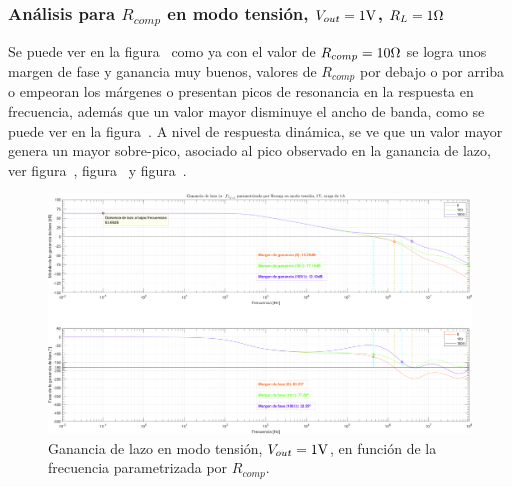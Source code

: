 \clearpage


\subsubsection{Análisis para $R_{comp}$ en modo tensión, $V_{out} = 1 \si[per-mode=symbol]{\volt}$, $R_{L} = 1 \si[per-mode=symbol]{\ohm}$}

Se puede ver en la figura~ como ya con el valor de $R_{comp} = 10 \si[per-mode=symbol]{\ohm}$ se logra unos margen de fase y ganancia muy buenos, valores de $R_{comp}$ por debajo o por arriba o empeoran los márgenes o presentan picos de resonancia en la respuesta en frecuencia, además que un valor mayor disminuye el ancho de banda, como se puede ver en la figura~. A nivel de respuesta dinámica, se ve que un valor mayor genera un mayor sobre-pico, asociado al pico observado en la ganancia de lazo, ver figura~, figura~ y figura~.

\vfill



\clearpage

\begin{figure}[H] %
\begin{center}
\includegraphics[width=1.1 \textwidth, angle=90]{./img/plots/loop/power_supply_RCOMP_LOOP_Modo2.png}
\caption{\label{fig:fig_power_supply_RCOMP_LOOP_Modo2}\footnotesize{Ganancia de lazo en modo tensión, $V_{out} = 1 \si[per-mode=symbol]{\volt}$, en función de la frecuencia parametrizada por $R_{comp}$.}}
\end{center}
\end{figure}


